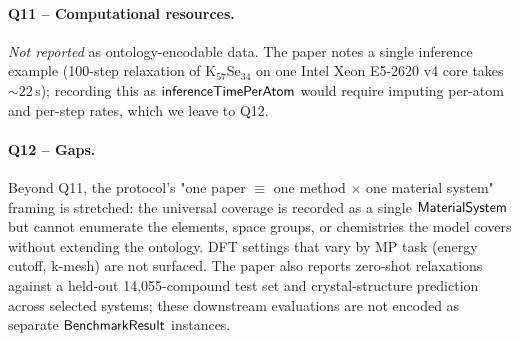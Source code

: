 \paragraph{Q11 -- Computational resources.}
\emph{Not reported} as ontology-encodable data. The paper notes a
single inference example (100-step relaxation of K$_{57}$Se$_{34}$ on
one Intel Xeon E5-2620 v4 core takes ${\sim}22$\,s); recording this as
$\mathsf{inferenceTimePerAtom}$ would require imputing per-atom and
per-step rates, which we leave to Q12.


\paragraph{Q12 -- Gaps.}
Beyond Q11, the protocol's "one paper $\equiv$ one method $\times$ one
material system" framing is stretched: the universal coverage is
recorded as a single $\mathsf{MaterialSystem}$ but cannot enumerate the
elements, space groups, or chemistries the model covers without
extending the ontology. DFT settings that vary by MP task (energy
cutoff, k-mesh) are not surfaced. The paper also reports zero-shot
relaxations against a held-out 14{,}055-compound test set and
crystal-structure prediction across selected systems; these
downstream evaluations are not encoded as separate
$\mathsf{BenchmarkResult}$ instances.
